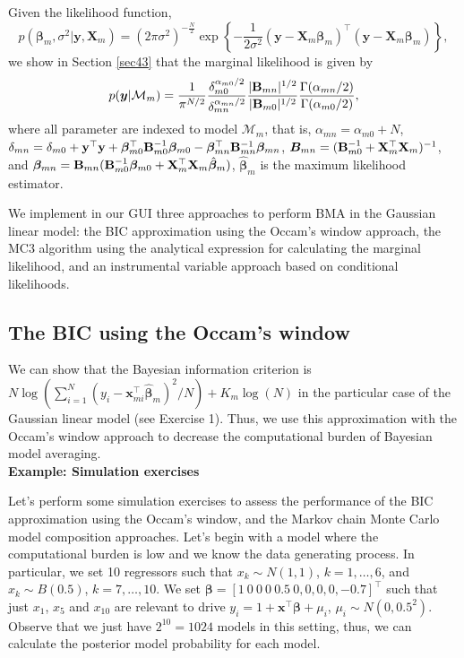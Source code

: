 Given the likelihood function, 
\begin{equation*}
	p(\bm{\beta}_m, \sigma^2|\bm{y}, \bm{X}_m) = (2\pi\sigma^2)^{-\frac{N}{2}} \exp \left\{-\frac{1}{2\sigma^2} (\bm{y} - \bm{X}_m\bm{\beta}_m)^{\top}(\bm{y} - \bm{X}_m\bm{\beta}_m) \right\},
\end{equation*}
we show in Section \ref{sec43} that the marginal likelihood is given by 
\begin{equation*}
	p(\bm{y}|\mathcal{M}_m)= \frac{1}{\pi^{N/2}}\frac{\delta_{m0}^{\alpha_{m0}/2}}{\delta_{mn}^{\alpha_{mn}/2}}\frac{|{\bf{B}}_{mn}|^{1/2}}{|{\bf{B}}_{m0}|^{1/2}}\frac{\Gamma(\alpha_{mn}/2)}{\Gamma(\alpha_{m0}/2)},
\end{equation*}
where all parameter are indexed to model $\mathcal{M}_m$, that is, $\alpha_{mn}=\alpha_{m0}+N$, $\delta_{mn}=\delta_{m0} + {\bf{y}}^{\top}{\bf{y}} + \bm{\beta}_{m0}^{\top}{\bf{B}}_{m0}^{-1}\bm{\beta}_{m0} - \bm{\beta}_{mn}^{\top}{\bf{B}}_{mn}^{-1}\bm{\beta}_{mn}$, $\bm{B}_{mn}=({\bf{B}}_{m0}^{-1} + {\bf{X}}^{\top}_m{\bf{X}}_m)^{-1}$, and $\bm{\beta}_{mn} = {{\bf{B}}}_{mn}({\bf{B}}_{m0}^{-1}\bm{\beta}_{m0} + {\bf{X}}^{\top}_m{\bf{X}}_m\hat{\bm{\beta}}_m)$, $\hat{\bm{\beta}}_m$ is the maximum likelihood estimator.

We implement in our GUI three approaches to perform BMA in the Gaussian linear model: the BIC approximation using the Occam's window approach, the MC3 algorithm using the analytical expression for calculating the marginal likelihood, and an instrumental variable approach based on conditional likelihoods.

\subsection{The BIC using the Occam's window}\label{sec10_21}

We can show that the Bayesian information criterion is $N\log(\sum_{i=1}^N(y_i-\bm{x}_{mi}^{\top}\hat{\bm{\beta}}_m)^2/N)+K_m\log(N)$ in the particular case of the Gaussian linear model (see Exercise 1). Thus, we use this approximation with the Occam's window approach to decrease the computational burden of Bayesian model averaging.\\

\textbf{Example: Simulation exercises}

Let's perform some simulation exercises to assess the performance of the BIC approximation using the Occam's window, and the Markov chain Monte Carlo model composition approaches. Let's begin with a model where the computational burden is low and we know the data generating process. In particular, we set 10 regressors such that $x_k\sim N(1, 1)$, $k =1,\dots,6$, and $x_k\sim B(0.5)$, $k=7,\dots,10$. We set $\bm{\beta}=[1 \ 0 \ 0 \ 0 \ 0.5 \ 0, 0, 0, 0, -0.7]^{\top}$ such that just $x_1$, $x_5$ and $x_{10}$ are relevant to drive $y_i=1+\bm{x}^{\top}\bm{\beta}+\mu_i$, $\mu_i\sim N(0,0.5^2)$. Observe that we just have $2^{10}=1024$ models in this setting, thus, we can calculate the posterior model probability for each model. 

